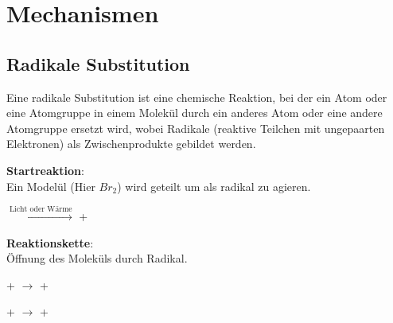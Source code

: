 \section{Mechanismen}

\subsection{Radikale Substitution}
Eine radikale Substitution ist eine chemische Reaktion, bei der ein Atom oder eine Atomgruppe in einem Molekül durch ein anderes Atom oder eine andere Atomgruppe ersetzt wird, wobei Radikale (reaktive Teilchen mit ungepaarten Elektronen) als Zwischenprodukte gebildet werden.

\textbf{Startreaktion}: \\
Ein Modelül (Hier $Br_2$) wird geteilt um als radikal zu agieren.

\hspace{0.3cm}
$\xrightarrow{\text{Licht oder Wärme}}$
\hspace{0.3cm}
+

\vspace{0.5cm}

\textbf{Reaktionskette}: \\
Öffnung des Moleküls durch Radikal. 

\hspace{0.3cm}
+
\hspace{0.3cm}
\hspace{0.3cm}
$\longrightarrow$
\hspace{0.3cm}
\hspace{0.3cm}
+
\hspace{0.3cm}

\hspace{0.3cm}
+
\hspace{0.3cm}
\hspace{0.3cm}
$\longrightarrow$
\hspace{0.3cm}
\hspace{0.3cm}
+
\hspace{0.3cm}

